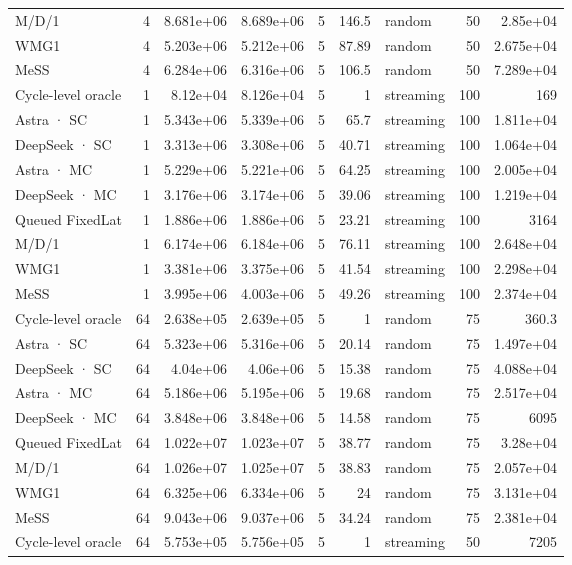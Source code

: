\begin{tabular}{lrrrrrlrr}
M/D/1 & 4 & 8.681e+06 & 8.689e+06 & 5 & 146.5 & random & 50 & 2.85e+04 \\
WMG1 & 4 & 5.203e+06 & 5.212e+06 & 5 & 87.89 & random & 50 & 2.675e+04 \\
MeSS & 4 & 6.284e+06 & 6.316e+06 & 5 & 106.5 & random & 50 & 7.289e+04 \\
Cycle-level oracle & 1 & 8.12e+04 & 8.126e+04 & 5 & 1 & streaming & 100 & 169 \\
Astra · SC & 1 & 5.343e+06 & 5.339e+06 & 5 & 65.7 & streaming & 100 & 1.811e+04 \\
DeepSeek · SC & 1 & 3.313e+06 & 3.308e+06 & 5 & 40.71 & streaming & 100 & 1.064e+04 \\
Astra · MC & 1 & 5.229e+06 & 5.221e+06 & 5 & 64.25 & streaming & 100 & 2.005e+04 \\
DeepSeek · MC & 1 & 3.176e+06 & 3.174e+06 & 5 & 39.06 & streaming & 100 & 1.219e+04 \\
Queued FixedLat & 1 & 1.886e+06 & 1.886e+06 & 5 & 23.21 & streaming & 100 & 3164 \\
M/D/1 & 1 & 6.174e+06 & 6.184e+06 & 5 & 76.11 & streaming & 100 & 2.648e+04 \\
WMG1 & 1 & 3.381e+06 & 3.375e+06 & 5 & 41.54 & streaming & 100 & 2.298e+04 \\
MeSS & 1 & 3.995e+06 & 4.003e+06 & 5 & 49.26 & streaming & 100 & 2.374e+04 \\
Cycle-level oracle & 64 & 2.638e+05 & 2.639e+05 & 5 & 1 & random & 75 & 360.3 \\
Astra · SC & 64 & 5.323e+06 & 5.316e+06 & 5 & 20.14 & random & 75 & 1.497e+04 \\
DeepSeek · SC & 64 & 4.04e+06 & 4.06e+06 & 5 & 15.38 & random & 75 & 4.088e+04 \\
Astra · MC & 64 & 5.186e+06 & 5.195e+06 & 5 & 19.68 & random & 75 & 2.517e+04 \\
DeepSeek · MC & 64 & 3.848e+06 & 3.848e+06 & 5 & 14.58 & random & 75 & 6095 \\
Queued FixedLat & 64 & 1.022e+07 & 1.023e+07 & 5 & 38.77 & random & 75 & 3.28e+04 \\
M/D/1 & 64 & 1.026e+07 & 1.025e+07 & 5 & 38.83 & random & 75 & 2.057e+04 \\
WMG1 & 64 & 6.325e+06 & 6.334e+06 & 5 & 24 & random & 75 & 3.131e+04 \\
MeSS & 64 & 9.043e+06 & 9.037e+06 & 5 & 34.24 & random & 75 & 2.381e+04 \\
Cycle-level oracle & 64 & 5.753e+05 & 5.756e+05 & 5 & 1 & streaming & 50 & 7205 \\

\end{tabular}
